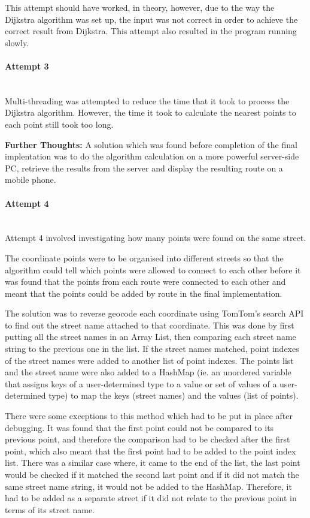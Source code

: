 \documentclass[12pt,a4paper]{article}
\newcommand{\myparagraph}[1]{\paragraph{#1}\mbox{}\\}
\begin{document}
This attempt should have worked, in theory, however, due to the way the Dijkstra algorithm was set up, the input was not correct in order to achieve the correct result from Dijkstra. This attempt also resulted in the program running slowly.

\myparagraph{Attempt 3}
Multi-threading was attempted to reduce the time that it took to process the Dijkstra algorithm. However, the time it took to calculate the nearest points to each point still took too long.

\textbf{Further Thoughts: }
A solution which was found before completion of the final implentation was to do the algorithm calculation on a more powerful server-side PC, retrieve the results from the server and display the resulting route on a mobile phone.


\myparagraph{Attempt 4}
Attempt 4 involved investigating how many points were found on the same street.

The coordinate points were to be organised into different streets so that the algorithm could tell which points were allowed to connect to each other before it was found that the points from each route were connected to each other and meant that the points could be added by route in the final implementation.

The solution was to reverse geocode each coordinate using TomTom’s search API to find out the street name attached to that coordinate. This was done by first putting all the street names in an Array List, then comparing each street name string to the previous one in the list. If the street names matched, point indexes of the street names were added to another list of point indexes. The points list and the street name were also added to a HashMap (ie. an unordered variable that assigns keys of a user-determined type to a value or set of values of a user-determined type) to map the keys (street names) and the values (list of points).

There were some exceptions to this method which had to be put in place after debugging. It was found that the first point could not be compared to its previous point, and therefore the comparison had to be checked after the first point, which also meant that the first point had to be added to the point index list. There was a similar case where, it came to the end of the list, the last point would be checked if it matched the second last point and if it did not match the same street name string, it would not be added to the HashMap. Therefore, it had to be added as a separate street if it did not relate to the previous point in terms of its street name.
\end{document}
